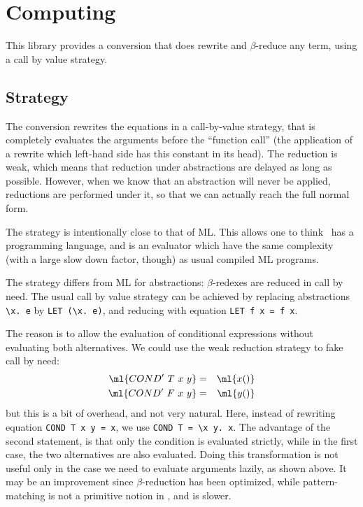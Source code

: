 
\chapter{Computing}

This library provides a conversion that does rewrite and
$\beta$-reduce any term, using a call by value strategy.


\section{Strategy}

The  conversion rewrites the equations in a call-by-value
strategy, that is completely evaluates the arguments before the
``function call'' (the application of a rewrite which left-hand side
has this constant in its head). The reduction is weak, which means
that reduction under abstractions are delayed as long as
possible. However, when we know that an abstraction will never be
applied, reductions are performed under it, so that we can actually
reach the full normal form.

The strategy is intentionally close to that of ML. This allows one to
think \HOL\ has a programming language, and  is an
evaluator which have the same complexity (with a large slow down factor,
though) as usual compiled ML programs.

The strategy differs from ML for abstractions: $\beta$-redexes are
reduced in call by need. The usual call by value strategy can be
achieved by replacing abstractions \verb#\x. e# by
\verb#LET (\x. e)#, and reducing  with equation
\verb#LET f x = f x#.

The reason is to allow the evaluation of conditional expressions
without evaluating both alternatives. We could use the weak reduction
strategy to fake call by need:
\begin{eqnarray*}
\ml{COND'~T~x~y} & = & \ml{x()} \\
\ml{COND'~F~x~y} & = & \ml{y()}
\end{eqnarray*}
but this is a bit of overhead, and not very natural. Here, instead of
rewriting equation \verb#COND T x y = x#, we use
\verb#COND T = \x y. x#. The advantage of the second statement, is
that only the condition is evaluated strictly, while in the first
case, the two alternatives are also evaluated. Doing this
transformation is not useful only in the case we need to evaluate
arguments lazily, as shown above. It may be an improvement since
$\beta$-reduction has been optimized, while pattern-matching is not a
primitive notion in \HOL, and is slower.



